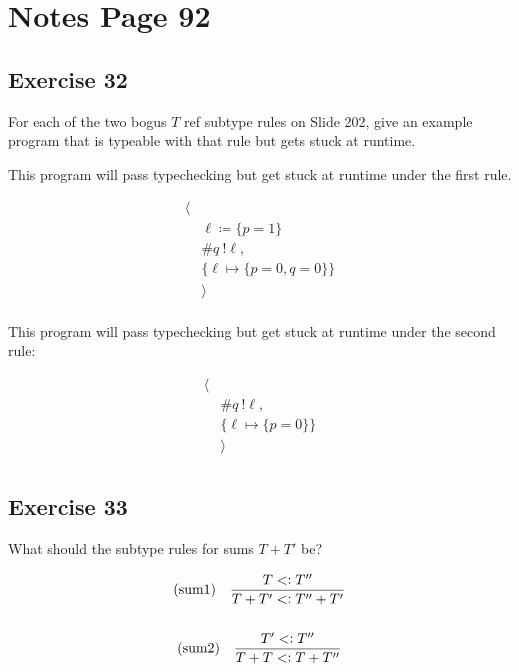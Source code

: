 \documentclass[10pt,\jkfside,a4paper]{article}
\begin{document}
\section{Notes Page 92}

\subsection*{Exercise 32}

For each of the two bogus $T$ ref subtype rules on Slide 202, give an
example program that is typeable with that rule but gets stuck at runtime.

This program will pass typechecking but get stuck at runtime under the first
rule.

\[
\begin{split}
\langle&\\
&\ell \coloneqq \{p = 1\} \\
&\#q \ !\ell, \\
&\{\ell \mapsto \{p=0, q=0\}\}\\
&\rangle \\
\end{split}
\]

This program will pass typechecking but get stuck at runtime under the
second rule:

\[
\begin{split}
\langle & \\
&\#q \ !\ell, \\
&\{\ell\mapsto \{p=0\}\}\\
&\rangle \\
\end{split}
\]

\subsection*{Exercise 33}

What should the subtype rules for sums $T + T'$ be?

\begin{gather*}
(\text{sum1}) \ \ \ \dfrac{
T <\vcentcolon T''
}{
T + T' <\vcentcolon T'' + T'
}\\\\
(\text{sum2}) \ \ \ \dfrac{
T' <\vcentcolon T''
}{
T + T <\vcentcolon T + T''
}
\end{gather*}
\end{document}
